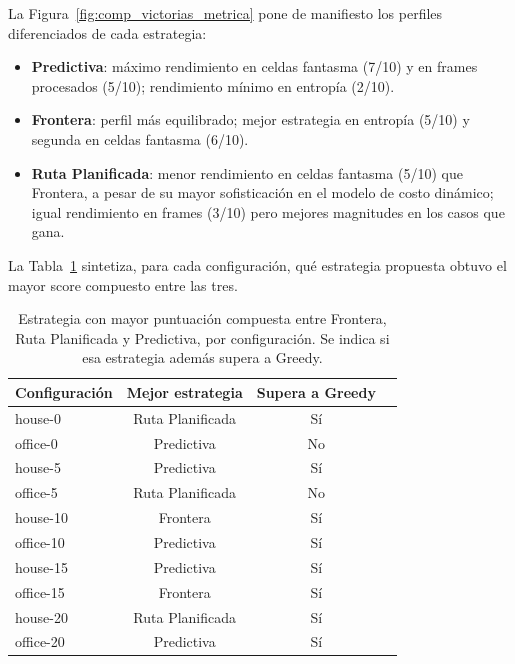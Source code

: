 La Figura~\ref{fig:comp_victorias_metrica} pone de manifiesto los perfiles diferenciados de cada estrategia:
\begin{itemize}
    \item \textbf{Predictiva}: máximo rendimiento en celdas fantasma (7/10) y en frames procesados (5/10); rendimiento mínimo en entropía (2/10).
    \item \textbf{Frontera}: perfil más equilibrado; mejor estrategia en entropía (5/10) y segunda en celdas fantasma (6/10).
    \item \textbf{Ruta Planificada}: menor rendimiento en celdas fantasma (5/10) que Frontera, a pesar de su mayor sofisticación en el modelo de costo dinámico; igual rendimiento en frames (3/10) pero mejores magnitudes en los casos que gana.
\end{itemize}

La Tabla~\ref{tab:comp_mejor_por_config} sintetiza, para cada configuración, qué estrategia propuesta obtuvo el mayor score compuesto entre las tres.

\begin{table}[htbp]
    \centering
    \caption{Estrategia con mayor puntuación compuesta entre Frontera, Ruta Planificada y Predictiva, por configuración. Se indica si esa estrategia además supera a Greedy.}%
    \label{tab:comp_mejor_por_config}
    \begin{tabular}{lccc}
        \toprule
        \textbf{Configuración} & \textbf{Mejor estrategia} & \textbf{Supera a Greedy} \\
        \midrule
        house-0   & Ruta Planificada & Sí \\
        office-0  & Predictiva       & No \\
        house-5   & Predictiva       & Sí \\
        office-5  & Ruta Planificada & No \\
        house-10  & Frontera         & Sí \\
        office-10 & Predictiva       & Sí \\
        house-15  & Predictiva       & Sí \\
        office-15 & Frontera         & Sí \\
        house-20  & Ruta Planificada & Sí \\
        office-20 & Predictiva       & Sí \\
        \bottomrule
    \end{tabular}
\end{table}

